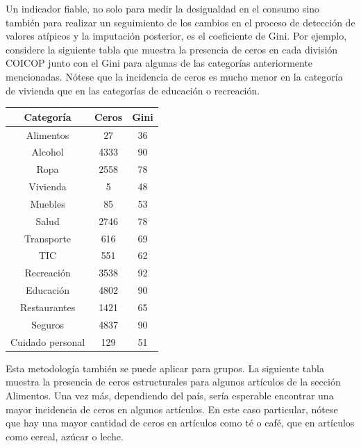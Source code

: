 \documentclass[
  12pt,
]{book}
\begin{document}
Un indicador fiable, no solo para medir la desigualdad en el consumo sino también para realizar un seguimiento de los cambios en el proceso de detección de valores atípicos y la imputación posterior, es el coeficiente de Gini. Por ejemplo, considere la siguiente tabla que muestra la presencia de ceros en cada división COICOP junto con el Gini para algunas de las categorías anteriormente mencionadas. Nótese que la incidencia de ceros es mucho menor en la categoría de vivienda que en las categorías de educación o recreación.

\begin{longtable}[]{@{}ccc@{}}
\toprule()
Categoría & Ceros & Gini \\
\midrule()
\endhead
Alimentos & 27 & 36 \\
Alcohol & 4333 & 90 \\
Ropa & 2558 & 78 \\
Vivienda & 5 & 48 \\
Muebles & 85 & 53 \\
Salud & 2746 & 78 \\
Transporte & 616 & 69 \\
TIC & 551 & 62 \\
Recreación & 3538 & 92 \\
Educación & 4802 & 90 \\
Restaurantes & 1421 & 65 \\
Seguros & 4837 & 90 \\
Cuidado personal & 129 & 51 \\
\bottomrule()
\end{longtable}

Esta metodología también se puede aplicar para grupos. La siguiente tabla muestra la presencia de ceros estructurales para algunos artículos de la sección Alimentos. Una vez más, dependiendo del país, sería esperable encontrar una mayor incidencia de ceros en algunos artículos. En este caso particular, nótese que hay una mayor cantidad de ceros en artículos como té o café, que en artículos como cereal, azúcar o leche.
\end{document}
